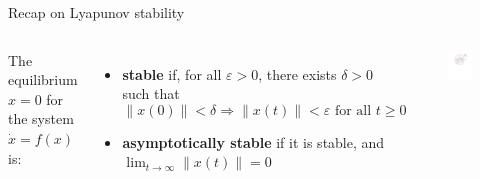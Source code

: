 \documentclass[aspectratio=169]{beamer}
\begin{document}
\begin{frame}{Recap on Lyapunov stability}
\begin{columns}
The equilibrium $x=0$ for the system $\dot x = f(x)$ is:
\begin{itemize}
\item
\textbf{stable} if, for all $\varepsilon > 0$, there exists $\delta > 0$ such that
$$
\|x(0)\| < \delta \Rightarrow \|x(t)\| < \varepsilon \text{ for all }  t \geq 0
$$
\item
\textbf{asymptotically stable} if it is stable, and $\lim_{t \rightarrow \infty} \| x(t)\| = 0$
\end{itemize}
\begin{figure}
\includegraphics[width=\columnwidth]{figures/stability.pdf}
\end{figure}
\end{columns}
\end{frame}
\end{document}
